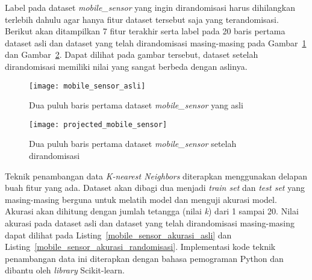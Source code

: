 Label pada dataset \textit{mobile\_sensor} yang ingin dirandomisasi harus dihilangkan terlebih dahulu agar hanya fitur dataset tersebut saja yang terandomisasi. Berikut akan ditampilkan 7 fitur terakhir serta label pada 20 baris pertama dataset asli dan dataset yang telah dirandomisasi masing-masing pada Gambar~\ref{fig:mobile_sensor_asli} dan Gambar~\ref{fig:projected_mobile_sensor}. Dapat dilihat pada gambar tersebut, dataset setelah dirandomisasi memiliki nilai yang sangat berbeda dengan aslinya. 

\begin{figure}
	\centering
	\texttt{[image: mobile\_sensor\_asli]}
	\caption{Dua puluh baris pertama dataset \textit{mobile\_sensor} yang asli}
	\label{fig:mobile_sensor_asli}
\end{figure}

\begin{figure}
	\centering
	\texttt{[image: projected\_mobile\_sensor]}
	\caption{Dua puluh baris pertama dataset \textit{mobile\_sensor} setelah dirandomisasi}
	\label{fig:projected_mobile_sensor}
\end{figure}

Teknik penambangan data \textit{K-nearest Neighbors} diterapkan menggunakan delapan buah fitur yang ada. Dataset akan dibagi dua menjadi \textit{train set} dan \textit{test set} yang masing-masing berguna untuk melatih model dan menguji akurasi model. Akurasi akan dihitung dengan jumlah tetangga (nilai \textit{k}) dari 1 sampai 20. Nilai akurasi pada dataset asli dan dataset yang telah dirandomisasi masing-masing dapat dilihat pada Listing~\ref{mobile_sensor_akurasi_asli} dan Listing~\ref{mobile_sensor_akurasi_randomisasi}. Implementasi kode teknik penambangan data ini diterapkan dengan bahasa pemograman Python dan dibantu oleh \textit{library} Scikit-learn. 

